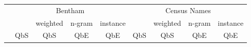 \documentclass[ms,electronic,twosidetoc,letterpaper,chaptercenter,parttop,lol,lof,lot]{byumsphd}
\begin{document}

\begin{table}
\centering
\begin{tabular}{| l | c c c c | c c c c |}
  \hline
   & \multicolumn{4}{c|}{Bentham} & \multicolumn{4}{c|}{Census Names}\\
   &     & weighted & n-gram & instance &     & weighted & n-gram & instance \\
   & QbS & QbS      & QbE    & QbE      & QbS & QbS      & QbE    & QbE \\

\end{tabular}
\end{table}
\end{document}
